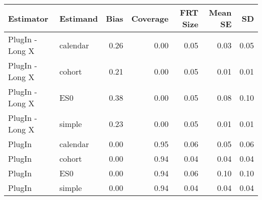 \captionsetup[table]{labelformat=empty,skip=1pt}
\begin{longtable}{llrrrrr}
\toprule
Estimator & Estimand & Bias & Coverage & FRT Size & Mean SE & SD \\ 
\midrule
PlugIn - Long X & calendar & 0.26 & 0.00 & 0.05 & 0.03 & 0.05 \\ 
PlugIn - Long X & cohort & 0.21 & 0.00 & 0.05 & 0.01 & 0.01 \\ 
PlugIn - Long X & ES0 & 0.38 & 0.00 & 0.05 & 0.08 & 0.10 \\ 
PlugIn - Long X & simple & 0.23 & 0.00 & 0.05 & 0.01 & 0.01 \\ 
PlugIn & calendar & 0.00 & 0.95 & 0.06 & 0.05 & 0.06 \\ 
PlugIn & cohort & 0.00 & 0.94 & 0.04 & 0.04 & 0.04 \\ 
PlugIn & ES0 & 0.00 & 0.94 & 0.06 & 0.10 & 0.10 \\ 
PlugIn & simple & 0.00 & 0.94 & 0.04 & 0.04 & 0.04 \\ 
 \bottomrule
\end{longtable}

